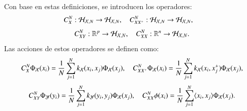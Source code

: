 Con base en estas definiciones, se introducen los operadores:
\begin{equation*}
    C_{X}^N : \mathcal{H}_{\mathcal{X}, N} \to \mathcal{H}_{\mathcal{X}, N}, \quad C_{XX^+}^N : \mathcal{H}_{\mathcal{X}, N} \to \mathcal{H}_{\mathcal{X}, N}, \quad 
\end{equation*}
\begin{equation*}
    C_{XY}^N : \mathbb{R}^p \to \mathcal{H}_{\mathcal{X}, N}, \quad C_{XX}^N : \mathbb{R}^n \to \mathcal{H}_{\mathcal{X}, N}.
\end{equation*}
Las acciones de estos operadores se definen como:
\begin{equation*}
    C_{X}^N \Phi_{\mathcal{X}} (x_i) = \frac{1}{N} \sum_{j = 1}^N k_{\mathcal{X}}(x_i, x_j) \Phi_{\mathcal{X}} (x_j), \quad C_{XX^+}^N \Phi_{\mathcal{X}} (x_i) = \frac{1}{N} \sum_{j = 1}^N k_{\mathcal{X}}(x_i, x_j^+) \Phi_{\mathcal{X}} (x_j),
\end{equation*}
\begin{equation*}
        C_{XY}^N \Phi_{\mathcal{Y}} (y_i) = \frac{1}{N} \sum_{j = 1}^N k_{\mathcal{Y}} (y_i, y_j) \Phi_{\mathcal{X}} (x_j), \quad C_{XX}^N \phi (x_i) = \frac{1}{N} \sum_{j = 1}^N \langle x_i, x_j \rangle \Phi_{\mathcal{X}} (x_j).
\end{equation*}

